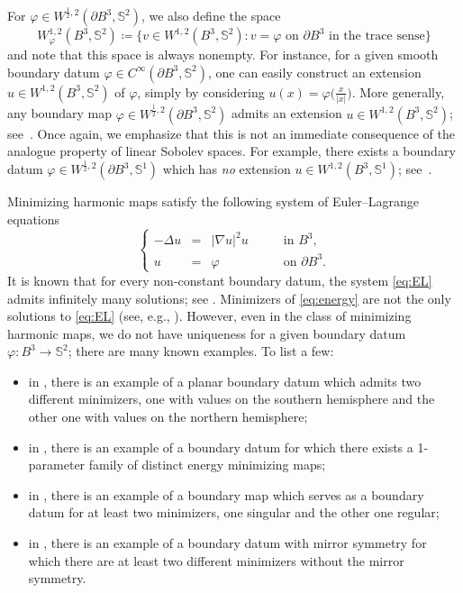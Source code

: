 \documentclass[12pt]{amsart}
\def\S{{\mathbb S}}
\numberwithin{theorem}{section} \numberwithin{equation}{section}
\begin{document}
For $\varphi \in W^{\frac12,2}(\partial B^3, \S^2)$, we also define the space
\[
  W^{1,2}_\varphi(B^3,\S^2) \coloneqq \{ v\in W^{1,2}(B^3,\S^2)\colon  v= \varphi \text{ on } \partial B^3 \text{ in the trace sense}\}
\]
and note that this space is always nonempty.
For instance, for a given smooth boundary datum $\varphi\in C^\infty(\partial B^3,\S^2)$, one can easily construct an extension $u\in W^{1,2}(B^3,\S^2)$ of \( \varphi \), simply by considering $u(x) = \varphi\bigl(\frac{x}{|x|}\bigr)$. 
More generally, any boundary map $\varphi \in W^{\frac 12,2}(\partial B^3,\S^2)$ admits an extension $u\in W^{1,2}(B^3,\S^2)$; see~\cite[Theorem 6.2]{HLp}.
Once again, we emphasize that this is not an immediate consequence of the analogue property of linear Sobolev spaces.
For example, there exists a boundary datum $\varphi \in W^{\frac 12,2}(\partial B^3,\S^1)$ which has \emph{no} extension $u\in W^{1,2}(B^3,\S^1)$; see~\cite[6.3]{HLp}.

Minimizing harmonic maps satisfy the following system of Euler--Lagrange  equations
\begin{equation}\label{eq:EL}
\left\{
\begin{array}{rcll}
-\Delta u & = & |\nabla u|^2 u\qquad&\mbox{in $B^3$,}\\
u & = &\varphi\qquad&\mbox{on $\partial B^3$}\text{.}
\end{array}
\right.
\end{equation}
It is known that for every non-constant boundary datum, the system \eqref{eq:EL} admits infinitely many solutions; see \cite{RivierePhd}. Minimizers of \eqref{eq:energy} are not the only solutions to \eqref{eq:EL} (see, e.g., \cite[Section 3]{HKLu}). However, even in the class of minimizing harmonic maps, we do not have uniqueness for a given boundary datum $\varphi\colon B^3 \to \S^2$; there are many known examples.
To list a few:
\begin{itemize}
 \item in \cite[Section 3]{HardtKinderlehrer}, there is an example of a planar boundary datum which admits two different minimizers, one with values on the southern hemisphere and the other one with values on the northern hemisphere;
 \item in \cite[2.2. Corollary]{HKL-thevariety88}, there is an example of a boundary datum for which there exists a 1-parameter family of distinct energy minimizing maps;
 \item in \cite[Section 5]{HardtLin89}, there is an example of a boundary map which serves as a boundary datum for at least two minimizers, one singular and the other one regular;
 \item in \cite[5.5 Theorem]{AL88}, there is an example of a boundary datum with mirror symmetry for which there are at least two different minimizers without the mirror symmetry.
\end{itemize}
\end{document}
